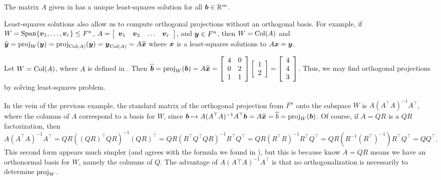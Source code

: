 \begin{Exam} The matrix $A$ given in  has a unique least-squares solution for all $\bb b \in \R^m$. \end{Exam}\vs

Least-squares solutions also allow us to compute orthogonal projections without an orthogonal basis. For example, if $W = \Span\{\bb v_1, \ldots, \bb v_r\} \le F^n$,  $A = \mtx{cccc}{\bb v_1 & \bb v_2 & \ldots & \bb v_r}$, and $\bb y \in F^n$, then $W = \col(A)$ and $\widehat{\bb y} = \proj_W(\bb y) = \proj_{\col(A)}(\bb y) = \bb y_{\col(A)} = A\widehat{\bb x}$ where $\bb x$ is a least-squares solutions to $A\bb x = \bb y$.\\

\begin{Exam}\label{exam:proj} Let $W = \col(A)$, where $A$ is defined in . Then $\widehat{\bb b} = \proj_W(\bb b) = A\widehat{\bb x} = \mtx{rr}{4&0\\0&2\\1&1}\vr{1\\2} = \vr{4\\4\\3}$. Thus, we may find  orthogonal projections by solving least-squares problem.
\end{Exam}

In the vein of the previous example, the standard matrix of the orthogonal projection from $F^n$ onto the subspace $W$ is $A(A^\top A)^{-1}A^\top$, where the columns of $A$ correspond to a basis for $W$, since $\bb b  \mapsto A(A^\top A)^{-1}A^\top \bb b = A\widehat{\bb x} = \widehat{b} = \proj_W(\bb b)$. Of course, if $A=QR$ is a $QR$ factorization, then 
\[A(A^\top A)^{-1}A^\top = QR((QR)^\top QR)^{-1}(QR)^\top = QR(R^\top Q^\top QR)^{-1}R^\top Q^\top = QR(R^\top R)^{-1}R^\top Q^\top = QR(R^{-1}(R^\top)^{-1})R^\top Q^\top = QQ^\top.\] This second form appears much simpler (and agrees with the formula we found in ), but this is because know $A=QR$ means we have an orthonormal basis for $W$, namely the columns of $Q$. The advantage of $A(A\top A)^{-1}A^\top$ is that no orthogonalization is necessarily to determine $\proj_W$.

